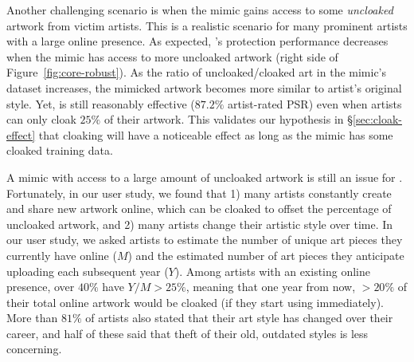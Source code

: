  Another challenging scenario
is when the mimic gains access to some \textit{uncloaked} artwork from victim
artists. This is a realistic scenario for many prominent artists with a large
online presence. As expected, \system{}'s protection performance decreases
when the mimic has access to more uncloaked artwork (right side of
Figure~\ref{fig:core-robust}). As the ratio of uncloaked/cloaked art in the
mimic's dataset increases, the mimicked artwork becomes more similar to
artist's original style. Yet, \system{} is still reasonably effective
($87.2\%$ artist-rated PSR) even when artists can only cloak $25\%$ of their
artwork. This validates our hypothesis in \S\ref{sec:cloak-effect} that
cloaking will have a noticeable effect as long as the mimic has some cloaked
training data.

A mimic with access to a large amount of uncloaked artwork is still an issue
for \system{}. Fortunately, in our user study, we found that 1) many artists
constantly create and share new artwork online, which can be cloaked to
offset the percentage of uncloaked artwork, and 2) many artists change their
artistic style over time. In our user study, we asked artists to estimate the
number of unique art pieces they currently have online ($M$) and the
estimated number of art pieces they anticipate uploading each subsequent year
($Y$). Among artists with an existing online presence, over $40\%$ have
$Y / M > 25\%$, meaning that one year from now, $> 20\%$ of their total
online artwork would be cloaked (if they start using \system{}
immediately). More than $81\%$ of artists also stated that their art style
has changed over their career, and half of these said that theft of their
old, outdated styles is less concerning.


